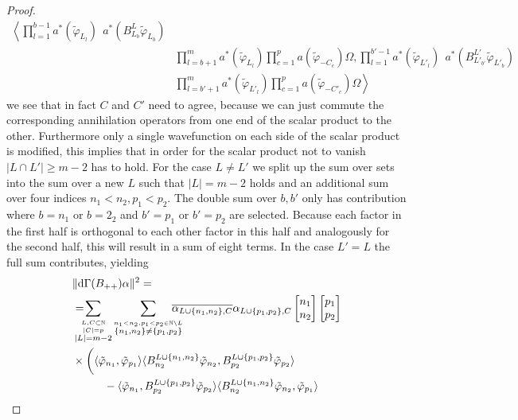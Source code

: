 \documentclass[b5paper,draft,openbib,12pt]{memoir}
\begin{document}
\begin{proof}
\begin{align}
\left\langle \prod_{l=1}^{b-1} a^*(\tilde{\varphi}_{L_l})  ~~ a^*(B^{L}_{L_b} \tilde{\varphi}_{L_b})\right.  \\\nonumber
&\prod_{l=b+1}^m a^*(\tilde{\varphi}_{L_l}) \prod_{c=1}^p a(\tilde{\varphi}_{-C_c}) \Omega, 
\prod_{l=1}^{b'-1} a^*(\tilde{\varphi}_{L'_l})  ~~ a^*(B_{L'_{b'}}^{L'} \tilde{\varphi}_{L'_b})  \\
&\left.\prod_{l=b'+1}^m a^*(\tilde{\varphi}_{L'_l}) \prod_{c=1}^p a(\tilde{\varphi}_{-C'_c}) \Omega\right\rangle
\end{align}
we see that in fact \(C\) and \(C'\) need to agree, because 
we can just commute the corresponding annihilation operators 
from one end of the 
scalar product to the other. Furthermore only a single 
wavefunction on each side of the scalar product is modified, 
this implies that in order for the
scalar product not to vanish \(|L\cap L'|\ge m-2\) has to 
hold. For the case  \(L\neq L'\) we split up the sum over sets 
into the sum over a new \(L\) such that \(|L|=m-2\) holds 
and an additional sum 
over four indices \(n_1<n_2, p_1<p_2\). 
The double sum over \(b,b'\) only has  
contribution where 
\(b=n_1\) or \(b=2_2\) and \(b'=p_1\) or \(b'=p_2\) 
are selected. Because each factor in the first half is
orthogonal to each other factor in this half and analogously 
for the second half, this will result in a sum of eight terms. 
In the case 
\(L'=L\) the full sum contributes, yielding 
\begin{align}\nonumber
&\|\mathrm{d}\Gamma(B_{++})\alpha\|^2 = \\\nonumber
&= \hspace{-0.4cm}\sum_{\overset{L,C\subset \mathbb{N}}{\overset{|C|=p}{|L|=m-2}}}\sum_{\overset{n_1<n_2,p_1<p_2\in\mathbb{N}\backslash L }{\{n_1,n_2\}\neq \{p_1,p_2\}}}
\hspace{-0.4cm}\overline{\alpha_{L\cup\{n_1,n_2\},C}}\alpha_{L\cup\{p_1,p_2\},C}
\left[\begin{matrix}n_1\\n_2\end{matrix}\right]\left[\begin{matrix}p_1\\p_2\end{matrix}\right]\\\label{B++estimate}
  &\times \bigg(\langle \tilde{\varphi}_{n_1},\tilde{\varphi}_{p_1} \rangle \langle B^{L\cup\{n_1,n_2\}}_{n_2} \tilde{\varphi}_{n_2}, B^{L\cup\{p_1,p_2\}}_{p_2}\tilde{\varphi}_{p_2}\rangle\\
  &\hspace{1cm}-\langle \tilde{\varphi}_{n_1},B^{L\cup\{p_1,p_2\}}_{p_2}\tilde{\varphi}_{p_2} \rangle \langle B^{L\cup\{n_1,n_2\}}_{n_2} \tilde{\varphi}_{n_2}, \tilde{\varphi}_{p_1}\rangle \\

\end{align}
\end{proof}
\end{document}
